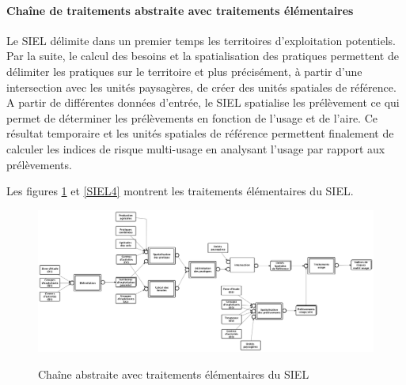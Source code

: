 \newpage

\paragraph{Chaîne de traitements abstraite avec traitements élémentaires\\}

Le SIEL délimite dans un premier temps les territoires d'exploitation potentiels. Par la suite, le calcul des besoins et la spatialisation des pratiques permettent de délimiter les pratiques sur le territoire et plus précisément, à partir d'une intersection avec les unités paysagères, de créer des unités spatiales de référence.\\

A partir de différentes données d'entrée, le SIEL spatialise les prélèvement ce qui permet de déterminer les prélèvements en fonction de l'usage et de l'aire. Ce résultat temporaire et les unités spatiales de référence permettent finalement de calculer les indices de risque multi-usage en analysant l'usage par rapport aux prélèvements.

Les figures \ref{SIEL3} et \ref{SIEL4} montrent les traitements élémentaires du SIEL.





\begin{landscape}
\begin{figure}[h] \centering
\includegraphics[width=23cm]{traitementsSiel3.png}\\
\caption{\label{SIEL3} Chaîne abstraite avec traitements élémentaires du SIEL}
\end{figure}
\end{landscape}

